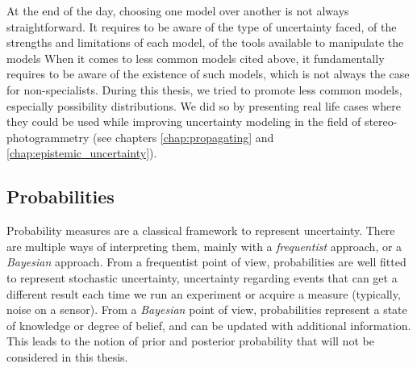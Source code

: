 At the end of the day, choosing one model over another is not always straightforward. It requires to be aware of the type of uncertainty faced, of the strengths and limitations of each model, of the tools available to manipulate the models \etc When it comes to less common models cited above, it fundamentally requires to be aware of the existence of such models, which is not always the case for non-specialists. During this thesis, we tried to promote less common models, especially possibility distributions. We did so by presenting real life cases where they could be used while improving uncertainty modeling in the field of stereo-photogrammetry (see chapters \ref{chap:propagating} and \ref{chap:epistemic_uncertainty}). 

\subsection{Probabilities}\label{sec:probabilities}
Probability measures are a classical framework to represent uncertainty. There are multiple ways of interpreting them, mainly with a \textit{frequentist} approach, or a \textit{Bayesian} approach. From a frequentist point of view, probabilities are well fitted to represent stochastic uncertainty, \ie uncertainty regarding events that can get a different result each time we run an experiment or acquire a measure (typically, noise on a sensor). From a \textit{Bayesian} point of view, probabilities represent a state of knowledge or degree of belief, and can be updated with additional information. This leads to the notion of prior and posterior probability that will not be considered in this thesis.

